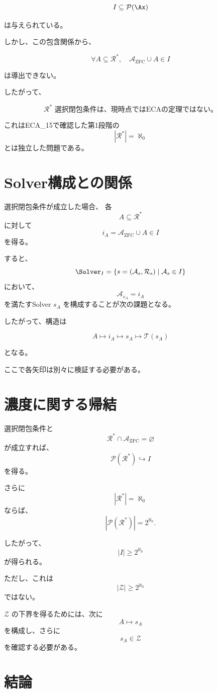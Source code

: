 \documentclass[11pt,a4paper]{article}
\begin{document}
\[
I\subseteq\mathcal P(\Ax)
\]

は与えられている。

しかし、この包含関係から、

\[
\forall A\subseteq\mathcal R^*,
\quad
\mathcal A_{\mathrm{ZFC}}\cup A\in I
\]

は導出できない。

したがって、

\[
\boxed{
\text{$\mathcal R^*$ 選択閉包条件は、現時点ではECAの定理ではない。}
}
\]

これはECA\_15で確認した第1段階の
\[
|\mathcal R^*|=\aleph_0
\]
とは独立した問題である。

\section{Solver構成との関係}

選択閉包条件が成立した場合、
各
\[
A\subseteq\mathcal R^*
\]
に対して
\[
i_A
=
\mathcal A_{\mathrm{ZFC}}\cup A
\in I
\]
を得る。

すると、
\[
\Solver_I
=
\{s=(\mathcal A_s,\mathcal R_s)\mid\mathcal A_s\in I\}
\]
において、
\[
\mathcal A_{s_A}=i_A
\]
を満たすSolver $s_A$ を構成することが次の課題となる。

したがって、構造は

\[
A
\longmapsto
i_A
\longmapsto
s_A
\longmapsto
\mathcal T(s_A)
\]

となる。

ここで各矢印は別々に検証する必要がある。

\section{濃度に関する帰結}

選択閉包条件と
\[
\mathcal R^*\cap\mathcal A_{\mathrm{ZFC}}=\varnothing
\]
が成立すれば、
\[
\mathcal P(\mathcal R^*)\hookrightarrow I
\]
を得る。

さらに
\[
|\mathcal R^*|=\aleph_0
\]
ならば、
\[
|\mathcal P(\mathcal R^*)|
=
2^{\aleph_0}.
\]

したがって、
\[
\boxed{
|I|\geq2^{\aleph_0}
}
\]
が得られる。

ただし、これは
\[
|\mathcal Z|\geq2^{\aleph_0}
\]
ではない。

$\mathcal Z$ の下界を得るためには、次に
\[
A\longmapsto s_A
\]
を構成し、さらに
\[
s_A\in\mathcal Z
\]
を確認する必要がある。

\section{結論}
\end{document}
